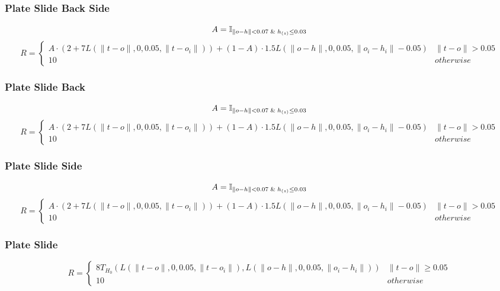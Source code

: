 {\subsubsection{Plate Slide Back Side}
\[
A=\mathbb{I}_{\lVert o - h \rVert < 0.07 \And h_{(z)} \leq 0.03}
\]
\[
R=\left\{
    \begin{array}{ll}
        A \cdot
        (2 + 7L(\lVert t - o \rVert, 0, 0.05, \lVert t - o_i \rVert)) + 
        (1-A) \cdot
        1.5L(\lVert o - h \rVert, 0, 0.05, \lVert o_i - h_i \rVert - 0.05)
            & \lVert t - o \rVert > 0.05 \\
        10
            & otherwise
    \end{array}
\right.
\]

\subsubsection{Plate Slide Back}
\[
A=\mathbb{I}_{\lVert o - h \rVert < 0.07 \And h_{(z)} \leq 0.03}
\]
\[
R=\left\{
    \begin{array}{ll}
        A \cdot
        (2 + 7L(\lVert t - o \rVert, 0, 0.05, \lVert t - o_i \rVert)) + 
        (1-A) \cdot
        1.5L(\lVert o - h \rVert, 0, 0.05, \lVert o_i - h_i \rVert - 0.05)
            & \lVert t - o \rVert > 0.05 \\
        10
            & otherwise
    \end{array}
\right.
\]

\subsubsection{Plate Slide Side}
\[
A=\mathbb{I}_{\lVert o - h \rVert < 0.07 \And h_{(z)} \leq 0.03}
\]
\[
R=\left\{
    \begin{array}{ll}
        A \cdot
        (2 + 7L(\lVert t - o \rVert, 0, 0.05, \lVert t - o_i \rVert)) + 
        (1-A) \cdot
        1.5L(\lVert o - h \rVert, 0, 0.05, \lVert o_i - h_i \rVert - 0.05)
            & \lVert t - o \rVert > 0.05 \\
        10
            & otherwise
    \end{array}
\right.
\]

\subsubsection{Plate Slide}
\[
R=\left\{
    \begin{array}{ll}
    8T_{H_0}(
        L(\lVert t - o \rVert, 0, 0.05, \lVert t - o_i \rVert),
        L(\lVert o - h \rVert, 0, 0.05, \lVert o_i - h_i \rVert)
    ) & \lVert t - o \rVert \geq 0.05 \\
    10 & otherwise
    \end{array}
\right.
\]

}
